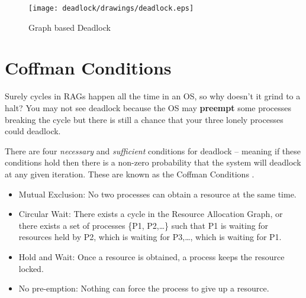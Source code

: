 \begin{figure}[H]
	\centering
	\texttt{[image: deadlock/drawings/deadlock.eps]}
	\caption{Graph based Deadlock}
\end{figure}

\section{Coffman Conditions}

Surely cycles in RAGs happen all the time in an OS, so why doesn't it grind to a halt?
You may not see deadlock because the OS may \textbf{preempt} some processes breaking the cycle but there is still a chance that your three lonely processes could deadlock.

There are four \emph{necessary} and \emph{sufficient} conditions for deadlock -- meaning if these conditions hold then there is a non-zero probability that the system will deadlock at any given iteration.
These are known as the Coffman Conditions \cite{coffman1971system}.

\begin{itemize}
	\tightlist
	\item
	      Mutual Exclusion: No two processes can obtain a resource at the same time.
	\item
	      Circular Wait: There exists a cycle in the Resource Allocation Graph, or there exists a set of processes \{P1, P2,\ldots{}\} such that P1 is waiting for resources held by P2, which is waiting for P3,\ldots{}, which is waiting for P1.
	\item
	      Hold and Wait: Once a resource is obtained, a process keeps the resource locked.
	\item
	      No pre-emption: Nothing can force the process to give up a resource.
\end{itemize}

